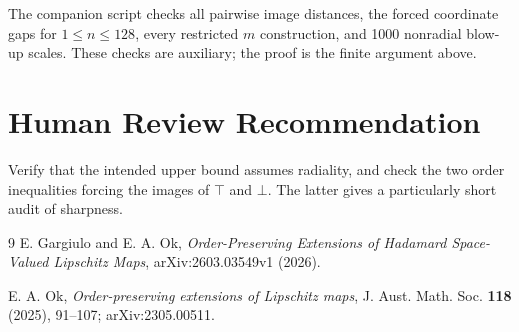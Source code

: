 \documentclass[11pt]{article}
\begin{document}
The companion script checks all pairwise image distances, the forced
coordinate gaps for $1\leq n\leq128$, every restricted $m$ construction,
and 1000 nonradial blow-up scales.  These checks are auxiliary; the proof is
the finite argument above.

\section*{Human Review Recommendation}

Verify that the intended upper bound assumes radiality, and check the two
order inequalities forcing the images of $\top$ and $\bot$.  The latter
gives a particularly short audit of sharpness.

\begin{thebibliography}{9}
\small
{}
E. Gargiulo and E. A. Ok,
\emph{Order-Preserving Extensions of Hadamard Space-Valued Lipschitz Maps},
arXiv:2603.03549v1 (2026).

E. A. Ok,
\emph{Order-preserving extensions of Lipschitz maps},
J. Aust. Math. Soc. \textbf{118} (2025), 91--107;
arXiv:2305.00511.
\end{thebibliography}
\end{document}
